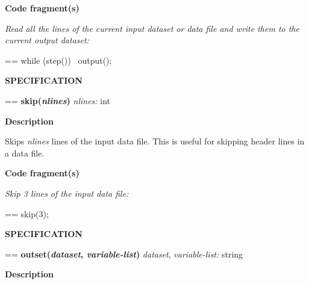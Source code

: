 \documentclass{book}
\makeatletter
\newcommand\Texinfocommandstyletextvar[1]{{\normalfont{}\textsl{#1}}}%
\newenvironment{Texinfopreformatted}{%
  \par\GNUTobeylines\obeyspaces\frenchspacing\parskip=\z@\parindent=\z@}{}
{\catcode`\^^M=13 \gdef\GNUTobeylines{\catcode`\^^M=13 \def^^M{\null\par}}}
\newenvironment{Texinfoindented}{\begin{list}{}{}\item\relax}{\end{list}}
\renewcommand{\_}{\Texinfounderscore\discretionary{}{}{}}
\makeatother
\begin{document}
\noindent{}\textbf{Code fragment(s)}

\emph{Read all the lines of the current input dataset or data
file and write them to the current output dataset:}
\begin{Texinfoindented}
\begin{Texinfopreformatted}%
\ttfamily while (step())
\  output();
\end{Texinfopreformatted}
\end{Texinfoindented}

\noindent{}\textbf{SPECIFICATION}
\begin{Texinfoindented}
\begin{Texinfopreformatted}%
\textbf{skip(\Texinfocommandstyletextvar{nlines})}
\Texinfocommandstyletextvar{nlines:} int
\end{Texinfopreformatted}
\end{Texinfoindented}
%
%
%
%
%

\noindent{}\textbf{Description}

Skips \Texinfocommandstyletextvar{nlines} lines of the input data file.
This is useful for skipping header lines in a data file.

\noindent{}\textbf{Code fragment(s)}

\emph{Skip 3 lines of the input data file:}
\begin{Texinfoindented}
\begin{Texinfopreformatted}%
\ttfamily skip(3);
\end{Texinfopreformatted}
\end{Texinfoindented}

\noindent{}\textbf{SPECIFICATION}
\begin{Texinfoindented}
\begin{Texinfopreformatted}%
\textbf{outset(\Texinfocommandstyletextvar{dataset}, \Texinfocommandstyletextvar{variable-list})}
\Texinfocommandstyletextvar{dataset}, \Texinfocommandstyletextvar{variable-list:} string
\end{Texinfopreformatted}
\end{Texinfoindented}
%
%
%

\noindent{}\textbf{Description}
\end{document}
